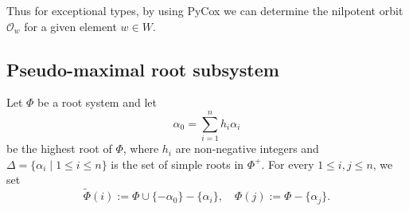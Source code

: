 \documentclass[reqno,12pt]{amsart}
\numberwithin{equation}{section}
\theoremstyle{plain}
\newtheorem{Lem}[Thm]{Lemma}
\theoremstyle{definition}
\newtheorem{Defff}[Thm]{Definition}
\renewcommand{\subset}{\subseteq}
\newcommand{\lest}{\leqslant}
\renewcommand{\leq}{\leqslant}
\begin{document}
 
 
 
	


Thus for exceptional types, by using PyCox we can determine the nilpotent orbit $\mathcal{O}_w$ for a given element $w\in W$.


\subsection{Pseudo-maximal root subsystem}







Let $\Phi$ be a root system and let
\[
\alpha_0=\sum_{i=1}^nh_i\alpha_i
\]
be the highest root of $\Phi$, where $h_i$ are non-negative integers and $\Delta=\{\alpha_i\mid 1\leq i\leq n\}$ is the set of simple roots in $\Phi^+$. 
For every $1\lest i, j \lest n$, we set
$$\tilde{\Phi}(i):=\Phi \cup \{-\alpha_0\} - \{\alpha_i\}, \quad \Phi(j):=\Phi - \{\alpha_j\}.$$
\end{document}
